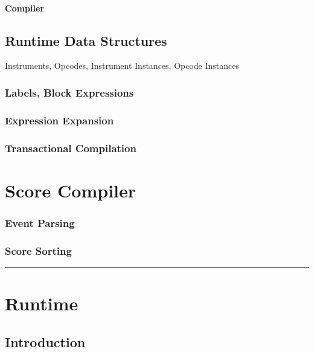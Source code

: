 \documentclass[]{book}
\begin{document}
\subsubsection{Compiler}

\section{Runtime Data Structures}

Instruments, Opcodes, Instrument Instances, Opcode Instances

\subsection{Labels, Block Expressions}

\subsection{Expression Expansion}

\subsection{Transactional Compilation}


\chapter{Score Compiler}

\subsection{Event Parsing}

\subsection{Score Sorting}

\begin{center}\rule{3in}{0.4pt}\end{center}


\chapter{Runtime}

\section{Introduction}
\end{document}
